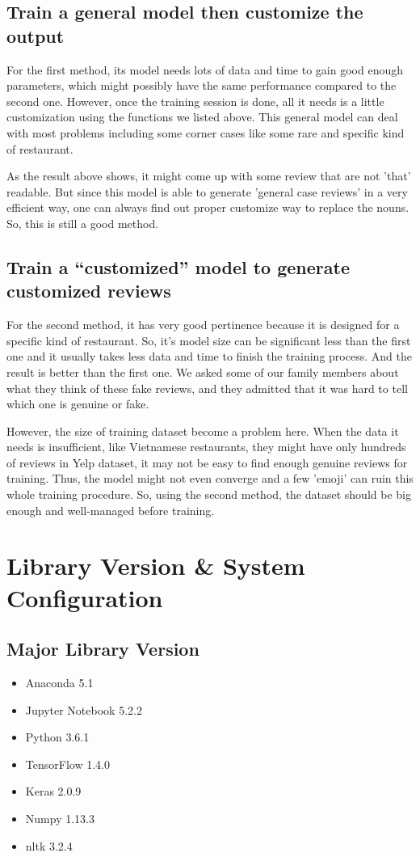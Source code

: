 \documentclass[conference]{IEEEtran}
\begin{document}
\subsection{Train a general model then customize the output}
\par For the first method, its model needs lots of data and time to gain good enough parameters, which might possibly have the same performance compared to the second one. However, once the training session is done, all it needs is a little customization using the functions we listed above. This general model can deal with most problems including some corner cases like some rare and specific kind of restaurant. 
\par As the result above shows, it might come up with some review that are not 'that' readable. But since this model is able to generate 'general case reviews' in a very efficient way, one can always find out proper customize way to replace the nouns. So, this is still a good method.
\subsection {Train a “customized” model to generate customized reviews}
\par For the second method, it has very good pertinence because it is designed for a specific kind of restaurant. So, it’s model size can be significant less than the first one and it usually takes less data and time to finish the training process. And the result is better than the first one. We asked some of our family members about what they think of these fake reviews, and they admitted that it was hard to tell which one is genuine or fake. 
\par However, the size of training dataset become a problem here. When the data it needs is insufficient, like Vietnamese restaurants, they might have only hundreds of reviews in Yelp dataset, it may not be easy to find enough genuine reviews for training. Thus, the model might not even converge and a few 'emoji' can ruin this whole training procedure. So, using the second method, the dataset should be big enough and well-managed before training.

\section{Library Version \& System Configuration}
\subsection{Major Library Version}
\begin{itemize}
\item Anaconda 5.1
\item Jupyter Notebook 5.2.2
\item Python 3.6.1
\item TensorFlow 1.4.0
\item Keras 2.0.9
\item Numpy 1.13.3
\item nltk 3.2.4
\end{itemize}
\end{document}
